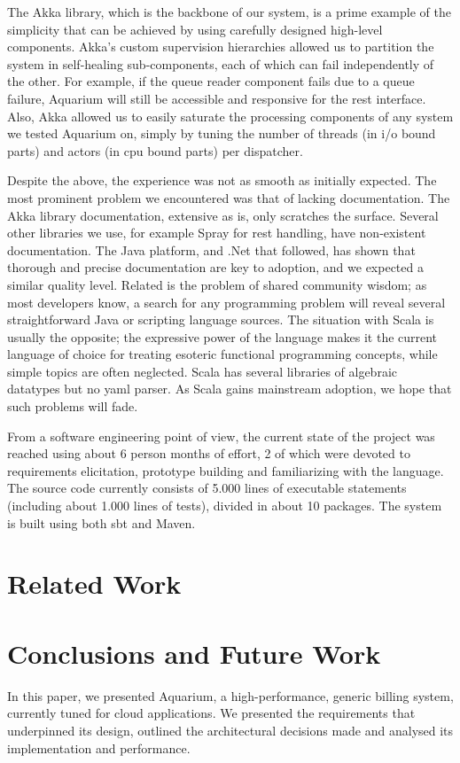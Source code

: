 \documentclass[preprint,10pt]{sigplanconf}
\begin{document}
The Akka library, which is the backbone of our system, is a prime example of 
the simplicity that can be achieved by using carefully designed high-level
components. Akka's custom supervision hierarchies allowed us to partition the
system in self-healing sub-components, each of which can fail independently
of the other. For example, if the queue reader component fails due to a queue
failure, Aquarium will still be accessible and responsive for the {\sc rest}
interface. Also, Akka allowed us to easily saturate the processing components
of any system we tested Aquarium on, simply by tuning the number of threads (in
{\sc i/o} bound parts) and actors (in {\sc cpu} bound parts) per dispatcher. 

Despite the above, the experience was not as smooth as initially expected. The
most prominent problem we encountered was that of lacking documentation. The
Akka library documentation, extensive as is, only scratches the surface.
Several other libraries we use, for example Spray for {\sc rest} handling, have
non-existent documentation. The Java platform, and .Net that followed, has
shown that thorough and precise documentation are key to adoption, and we
expected a similar quality level. Related is the problem of shared community
wisdom; as most developers know, a search for any programming problem will
reveal several straightforward Java or scripting language sources. The
situation with Scala is usually the opposite; the expressive power of the
language makes it the current language of choice for treating esoteric
functional programming concepts, while simple topics are often neglected. Scala
has several libraries of algebraic datatypes but no {\sc yaml} parser. As Scala
gains mainstream adoption, we hope that such problems will fade.

From a software engineering point of view, the current state of the project was
reached using about 6 person months of effort, 2 of which were devoted to
requirements elicitation, prototype building and familiarizing with the
language. The source code currently consists of 5.000 lines of executable
statements (including about 1.000 lines of tests), divided in about 10
packages. The system is built using both {\sc sbt} and Maven. 

\section{Related Work}

\section{Conclusions and Future Work}
In this paper, we presented Aquarium, a high-performance, generic billing 
system, currently tuned for cloud applications. We presented the requirements
that underpinned its design, outlined the architectural decisions made
and analysed its implementation and performance.
\end{document}

